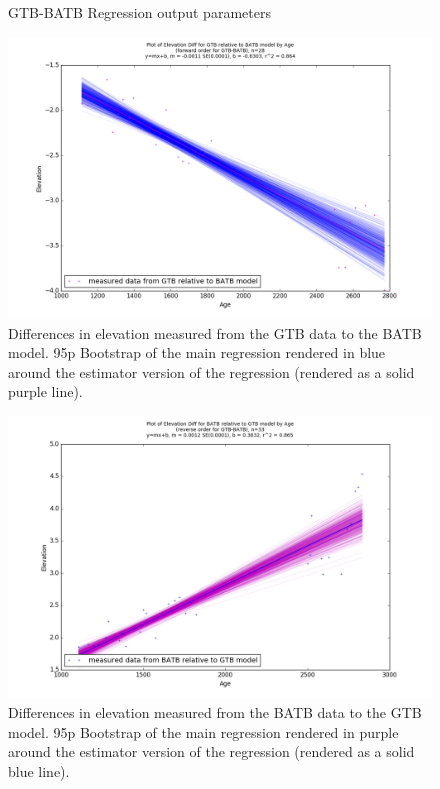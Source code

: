 \begin{figure}[H]
	\begin{flushleft}
	\end{flushleft}
	\caption{GTB-BATB Regression output parameters}
	\label{fig:GTBxBATB_regression}
\end{figure}

\newpage

\begin{figure}[H]
	\includegraphics[width=1.7\linewidth, angle=270 ]{data/bothNonZero/withinSeventyFivePercent/gias/theGIA_GTB_relative_to_BATB.png}
	\caption{Differences in elevation measured from the GTB data to the BATB model. 95p Bootstrap of the main regression rendered in blue around the estimator version of the regression (rendered as a solid purple line).}
	\label{fig:gias_GTBxBATB}
\end{figure}
\newpage


\begin{figure}[H]
	\includegraphics[width=1.7\linewidth, angle=270 ]{data/bothNonZero/withinSeventyFivePercent/gias/theGIA_BATB_relative_to_GTB.png}
	\caption{Differences in elevation measured from the BATB data to the GTB model. 95p Bootstrap of the main regression rendered in purple around the estimator version of the regression (rendered as a solid blue line).}
	\label{fig:gias_BATBxGTB}
\end{figure}
\newpage







